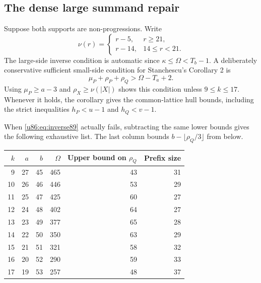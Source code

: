 \documentclass[11pt,a4paper]{article}
\theoremstyle{remark}
\begin{document}
\subsection{The dense large summand repair}
Suppose both supports are non-progressions. Write
\[
 \nu(r)=\begin{cases}r-5,&r\ge21,\\r-14,&14\le r<21.\end{cases}
\]
The large-side inverse condition is automatic since
$\kappa\le\Omega<T_b-1$. A deliberately conservative sufficient
small-side condition for Stanchescu's Corollary 2 is
\begin{equation}\label{u86:eq:inverse89}
 \mu_P+\rho_P+\rho_Q>\Omega-T_a+2.
\end{equation}
Using $\mu_P\ge a-3$ and $\rho_X\ge\nu(|X|)$ shows this condition
unless $9\le k\le17$. Whenever it holds, the corollary gives the
common-lattice hull bounds, including the strict inequalities
$h_P<u-1$ and $h_Q<v-1$.

When \eqref{u86:eq:inverse89} actually fails, subtracting the same lower
bounds gives the following exhaustive list. The last column bounds
$b-\lfloor\rho_Q/3\rfloor$ from below.
\begin{center}\small
\begin{tabular}{rrrrrr}
\toprule
$k$&$a$&$b$&$\Omega$&Upper bound on $\rho_Q$&Prefix size\\\midrule
9&27&45&465&43&31\\
10&26&46&446&53&29\\
11&25&47&425&60&27\\
12&24&48&402&64&27\\
13&23&49&377&65&28\\
14&22&50&350&63&29\\
15&21&51&321&58&32\\
16&20&52&290&59&33\\
17&19&53&257&48&37\\\bottomrule
\end{tabular}
\end{center}
\end{document}
